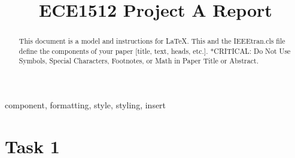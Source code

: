 \documentclass[conference]{IEEEtran}
\begin{document}
\title{ECE1512 Project A Report}

\author{
}

\maketitle

\begin{abstract}
This document is a model and instructions for \LaTeX.
This and the IEEEtran.cls file define the components of your paper [title, text, heads, etc.]. *CRITICAL: Do Not Use Symbols, Special Characters, Footnotes, 
or Math in Paper Title or Abstract.
\end{abstract}

\begin{IEEEkeywords}
component, formatting, style, styling, insert
\end{IEEEkeywords}

\section{Task 1}
\end{document}
